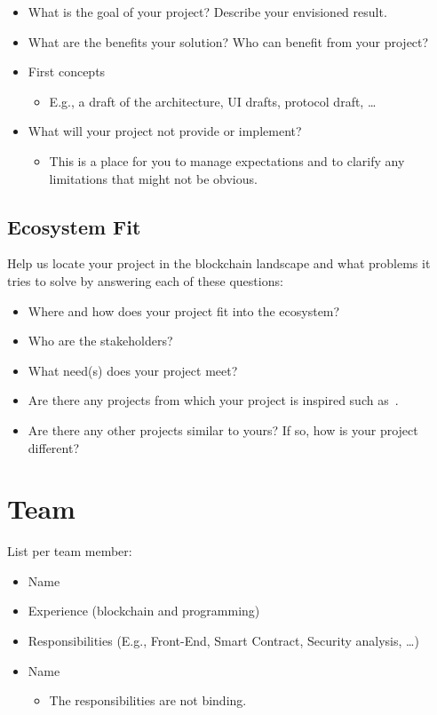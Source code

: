 \documentclass{scrarticle}
\begin{document}
	\begin{itemize}
		\item What is the goal of your project? Describe your envisioned result.
		\item What are the benefits your solution? Who can benefit from your project?
		\item First concepts
		\begin{itemize}
			\item E.g., a draft of the architecture, UI drafts, protocol draft, …
		\end{itemize}
		\item What will your project not provide or implement?
		\begin{itemize}
			\item This is a place for you to manage expectations and to clarify any limitations that might not be obvious.
		\end{itemize}
	\end{itemize}
	
	\subsection{Ecosystem Fit}
	
	Help us locate your project in the blockchain landscape and what problems it tries to solve by answering each of these questions:
	
	\begin{itemize}
		\item Where and how does your project fit into the ecosystem?
		\item Who are the stakeholders?
		\item What need(s) does your project meet?
		\item Are there any projects from which your project is inspired such as~\cite{buterin14, nakamoto08}.
		\item Are there any other projects similar to yours? If so, how is your project different?
	\end{itemize}		
	
	\section{Team}
	
	List per team member:
	\begin{itemize}
		\item Name
		\item Experience (blockchain and programming)
		\item Responsibilities (E.g., Front-End, Smart Contract, Security analysis, …)
		\item Name
		\begin{itemize}
			\item The responsibilities are not binding.
		\end{itemize}
	\end{itemize}	
	
\end{document}
